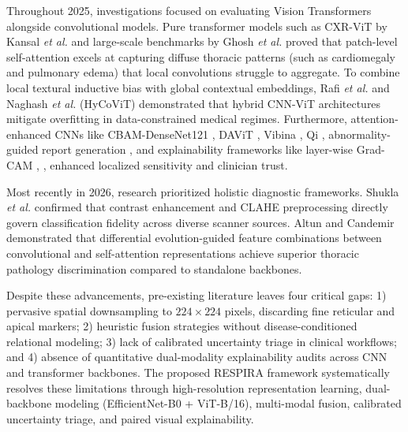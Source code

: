 \documentclass[journal]{IEEEtran}
\begin{document}
Throughout 2025, investigations focused on evaluating Vision Transformers alongside convolutional models. Pure transformer models such as CXR-ViT by Kansal \textit{et al.} \cite{kansal2025cxr} and large-scale benchmarks by Ghosh \textit{et al.} \cite{ghosh2025vision} proved that patch-level self-attention excels at capturing diffuse thoracic patterns (such as cardiomegaly and pulmonary edema) that local convolutions struggle to aggregate. To combine local textural inductive bias with global contextual embeddings, Rafi \textit{et al.} \cite{rafi2025chest} and Naghash \textit{et al.} \cite{naghash2025hycovit} (HyCoViT) demonstrated that hybrid CNN-ViT architectures mitigate overfitting in data-constrained medical regimes. Furthermore, attention-enhanced CNNs like CBAM-DenseNet121 \cite{dey2025cbam}, DAViT \cite{fu2025davit}, Vibina \cite{vibina2025deep}, Qi \cite{qi2025attention}, abnormality-guided report generation \cite{edirisinghe2025abnormality}, and explainability frameworks like layer-wise Grad-CAM \cite{pandit2025explainable}, \cite{kim2025explainable}, \cite{pabba2025explainable} enhanced localized sensitivity and clinician trust.

Most recently in 2026, research prioritized holistic diagnostic frameworks. Shukla \textit{et al.} \cite{shukla2026chest} confirmed that contrast enhancement and CLAHE preprocessing directly govern classification fidelity across diverse scanner sources. Altun and Candemir \cite{altun2026differential} demonstrated that differential evolution-guided feature combinations between convolutional and self-attention representations achieve superior thoracic pathology discrimination compared to standalone backbones.

Despite these advancements, pre-existing literature leaves four critical gaps: 1) pervasive spatial downsampling to $224 \times 224$ pixels, discarding fine reticular and apical markers; 2) heuristic fusion strategies without disease-conditioned relational modeling; 3) lack of calibrated uncertainty triage in clinical workflows; and 4) absence of quantitative dual-modality explainability audits across CNN and transformer backbones. The proposed RESPIRA framework systematically resolves these limitations through high-resolution representation learning, dual-backbone modeling (EfficientNet-B0 + ViT-B/16), multi-modal fusion, calibrated uncertainty triage, and paired visual explainability.
\end{document}
